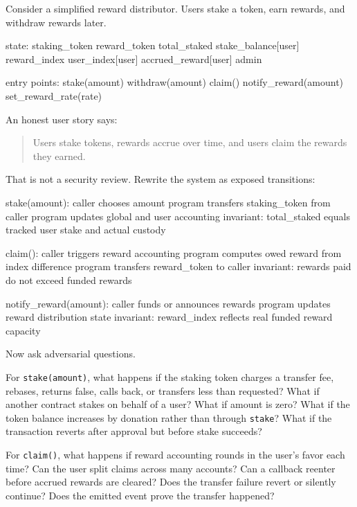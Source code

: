 Consider a simplified reward distributor. Users stake a token, earn rewards, and withdraw rewards later.

\begin{codeblock}
state:
    staking_token
    reward_token
    total_staked
    stake_balance[user]
    reward_index
    user_index[user]
    accrued_reward[user]
    admin

entry points:
    stake(amount)
    withdraw(amount)
    claim()
    notify_reward(amount)
    set_reward_rate(rate)
\end{codeblock}

An honest user story says:

\begin{quote}
Users stake tokens, rewards accrue over time, and users claim the rewards they earned.
\end{quote}

That is not a security review. Rewrite the system as exposed transitions:

\begin{codeblock}
stake(amount):
    caller chooses amount
    program transfers staking_token from caller
    program updates global and user accounting
    invariant: total_staked equals tracked user stake and actual custody

claim():
    caller triggers reward accounting
    program computes owed reward from index difference
    program transfers reward_token to caller
    invariant: rewards paid do not exceed funded rewards

notify_reward(amount):
    caller funds or announces rewards
    program updates reward distribution state
    invariant: reward_index reflects real funded reward capacity
\end{codeblock}

Now ask adversarial questions.

For \texttt{stake(amount)}, what happens if the staking token charges a transfer fee, rebases, returns false, calls back, or transfers less than requested? What if another contract stakes on behalf of a user? What if amount is zero? What if the token balance increases by donation rather than through \texttt{stake}? What if the transaction reverts after approval but before stake succeeds?

For \texttt{claim()}, what happens if reward accounting rounds in the user's favor each time? Can the user split claims across many accounts? Can a callback reenter before accrued rewards are cleared? Does the transfer failure revert or silently continue? Does the emitted event prove the transfer happened?

